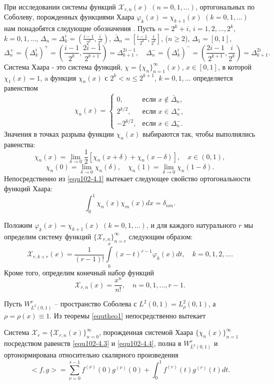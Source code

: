 При исследовании системы функций $\mathcal{ X}_{r,n}(x)$ $(n=0,1,\ldots)$, ортогональных по Соболеву, порожденных функциями  Хаара $\varphi_k(x)=\chi_{k+1}(x)$ $(k=0,1,\ldots)$ нам понадобятся следующие обозначения \cite{KashSaak}. Пусть $n=2^k+i$, $i=1,2,\ldots, 2^k$,  $k=0,1,\ldots$,
$\Delta_n=\Delta_k^i=(\frac{i-1}{2^k},\frac{i}{2^k})$, $\bar\Delta_n=[\frac{i-1}{2^k},\frac{i}{2^k}]$, ($n\ge2$), $\Delta_1=[0,1]$,
$$
 \Delta_n^+=(\Delta_k^i)^+=(\frac{i-1}{2^k},\frac{2i-1}{2^{k+1}})=\Delta_{k+1}^{2i-1}, \quad \Delta_n^-=(\Delta_k^i)^-=(\frac{2i-1}{2^{k+1}},\frac{i}{2^{k}})=\Delta_{k+1}^{2i}.
$$
Система Хаара - это система функций, $\chi=\{\chi_n\}_{n=1}^\infty(x)$, $x\in[0,1]$, в которой $\chi_1(x)=1$, a функция $\chi_n(x)$
с $2^k<n\le 2^{k+1}$, $k=0,1,\ldots$ определяется равенством
\begin{equation}\label{equ102-4.1}
\chi_n(x)=\begin{cases} 0,&\text{если $x\notin \bar\Delta_n$,}\\
2^{k/2},& \text{если $x\in \Delta_n^+$,}\\
-2^{k/2},& \text{если $x\in \Delta_n^-$.}
\end{cases}
\end{equation}
Значения в точках разрыва функции $\chi_n(x)$ выбираются так, чтобы выполнялись равенства:
$$
\chi_n(x)=\lim_{\delta\to0}\frac12[\chi_n(x+\delta)+\chi_n(x-\delta)],\quad x\in (0,1),
$$
$$
\chi_n(0)=\lim_{\delta\to0} \chi_n(\delta),\quad \chi_n(1)=\lim_{\delta\to0} \chi_n(1-\delta).
$$
Непосредственно из \eqref{equ102-4.1} вытекает следующее свойство ортогональности функций Хаара:
\begin{equation}\label{equ102-4.2}
\int_0^1\chi_n(x)\chi_m(x)dx=\delta_{nm}.
\end{equation}


Положим $\varphi_k(x)=\chi_{k+1}(x)$ $(k=0,1,\ldots)$, и для каждого натурального $r$ мы определим систему функций $\{\mathcal{ X}_{r,n}\}_{n=r}^\infty$ следующим образом:
\begin{equation}\label{equ102-4.3}
\mathcal{ X}_{r,k+r}(x) =\frac{1}{(r-1)!}\int\limits_0^x(x-t)^{r-1}\varphi_k(x)dt, \quad k=0,1, 2, \ldots.
\end{equation}
 Кроме того, определим конечный набор функций
  \begin{equation}\label{equ102-4.4}
\mathcal{ X}_{r,n}(x) =\frac{x^n}{n!}, \quad n=0,1,\ldots, r-1.
\end{equation}

  Пусть $W^r_{L^2(0,1)}$ --  пространство Соболева с  $L^2(0,1)=L^2_\rho(0,1)$, а $\rho=\rho(x) \equiv 1$. Из теоремы \ref{equtheo1} непосредственно вытекает
 \begin{corollary}\label{equcor2}
   Система $\mathcal{ X}_r=\{\mathcal{ X}_{r,n}(x)\}_{n=0}^\infty$, порожденная системой Хаара $\{\chi_{n}(x)\}_{n=1}^\infty$ посредством равенств \eqref{equ102-4.3} и \eqref{equ102-4.4}, полна  в $W^r_{L^2(0,1)}$ и ортонормирована относительно скалярного произведения
 \begin{equation}\label{equ102-4.5}
<f,g>=\sum_{\nu=0}^{r-1}f^{(\nu)}(0)g^{(\nu)}(0)+\int_{0}^{1} f^{(r)}(t)g^{(r)}(t) dt.
\end{equation}
 \end{corollary}

